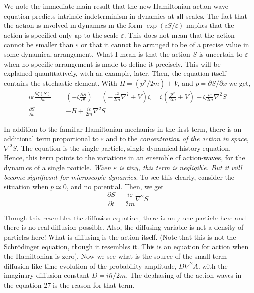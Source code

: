 We note the immediate main result that the new Hamiltonian action-wave equation
predicts intrinsic indeterminism in dynamics at all scales. The fact that the action is
involved in dynamics in the form $\exp(iS/\varepsilon)$ implies that the action is specified only up to
the scale $\varepsilon$. This does not mean that the action cannot be smaller than $\varepsilon$ or that it cannot be
arranged to be of a precise value in some dynamical arrangement. What I mean is that the
action $S$ is uncertain to $\varepsilon$ when no specific arrangement is made to define it precisely. This
will be explained quantitatively, with an example, later. Then, the equation itself contains
the stochastic element. With $H = (p^2 /2m) + V$, and $p = \partial S/\partial x$ we get,
\begin{align*}
i \varepsilon \frac{\partial \zeta (S)}{\partial t} & = \left(-\zeta \frac{\partial S}{\partial t} \right) = \left(-\frac{\varepsilon^2}{2m} \nabla^2 + V \right) \zeta = \zeta \left(\frac{p^2}{2m}  + V\right) - \zeta \frac{i\varepsilon}{2m} \nabla^2 S \tag{25}\\
\frac{\partial S}{\partial t} & = - H + \frac{i \varepsilon}{2m} \nabla^2 S\tag{26} 
\end{align*}

In addition to the familiar Hamiltonian mechanics in the first term, there is an additional
term proportional to $\varepsilon$ and to the \textit{concentration of the action in space}, $\nabla^2 S$. The equation
is the single particle, single dynamical history equation. Hence, this term points to the
variations in an ensemble of action-waves, for the dynamics of a single particle. \textit{When $\varepsilon$ is
tiny, this term is negligible. But it will become significant for microscopic dynamics}. To see
this clearly, consider the situation when $p \simeq 0$, and no potential. Then, we get
\begin{equation*}
\frac{\partial S}{\partial t} = \frac{i\varepsilon}{2m} \nabla^2 S \tag{27}
\end{equation*}

Though this resembles the diffusion equation, there is only one particle here and there is no
real diffusion possible. Also, the diffusing variable is not a density of particles here! What
is diffusing is the action itself. (Note that this is not the Schr\"{o}dinger equation, though it
resembles it. This is an equation for action when the Hamiltonian is zero). Now we see what
is the source of the small term diffusion-like time evolution of the probability amplitude,
$D \nabla^2 A$, with the imaginary diffusion constant $D = i \hbar /2m$. The dephasing of the action
waves in the equation 27 is the reason for that term.

